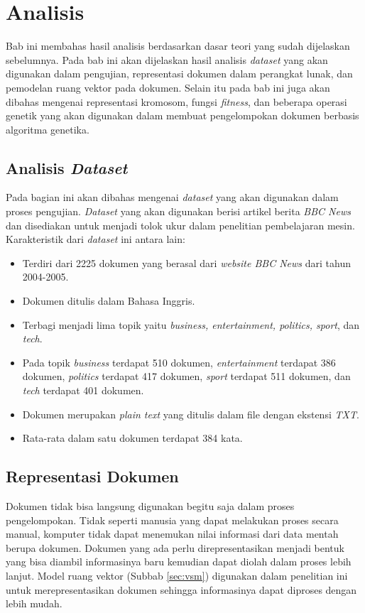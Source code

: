 \chapter{Analisis}
\label{chap:analisis}

Bab ini membahas hasil analisis berdasarkan dasar teori yang sudah dijelaskan sebelumnya. Pada bab ini akan dijelaskan hasil analisis \textit{dataset} yang akan digunakan dalam pengujian, representasi dokumen dalam perangkat lunak, dan pemodelan ruang vektor pada dokumen. Selain itu pada bab ini juga akan dibahas mengenai representasi kromosom, fungsi \textit{fitness}, dan beberapa operasi genetik yang akan digunakan dalam membuat pengelompokan dokumen berbasis algoritma genetika.

\section{Analisis \textit{Dataset}}
Pada bagian ini akan dibahas mengenai \textit{dataset} yang akan digunakan dalam proses pengujian. \textit{Dataset} yang akan digunakan berisi artikel berita \textit{BBC News} dan disediakan untuk menjadi tolok ukur dalam penelitian pembelajaran mesin. Karakteristik dari \textit{dataset} ini antara lain:

\begin{itemize}
	\item Terdiri dari 2225 dokumen yang berasal dari \textit{website BBC News} dari tahun 2004-2005.
	\item Dokumen ditulis dalam Bahasa Inggris.
	\item Terbagi menjadi lima topik yaitu \textit{business, entertainment, politics, sport}, dan \textit{tech}.
	\item Pada topik \textit{business} terdapat 510 dokumen, \textit{entertainment} terdapat 386 dokumen, \textit{politics} terdapat 417 dokumen, \textit{sport} terdapat 511 dokumen, dan \textit{tech} terdapat 401 dokumen.
	\item Dokumen merupakan \textit{plain text} yang ditulis dalam file dengan ekstensi \textit{TXT}.
	\item Rata-rata dalam satu dokumen terdapat 384 kata.
\end{itemize}

\section{Representasi Dokumen}
Dokumen tidak bisa langsung digunakan begitu saja dalam proses pengelompokan. Tidak seperti manusia yang dapat melakukan proses secara manual, komputer tidak dapat menemukan nilai informasi dari data mentah berupa dokumen. Dokumen yang ada perlu direpresentasikan menjadi bentuk yang bisa diambil informasinya baru kemudian dapat diolah dalam proses lebih lanjut. Model ruang vektor (Subbab \ref{sec:vsm}) digunakan dalam penelitian ini untuk merepresentasikan dokumen sehingga informasinya dapat diproses dengan lebih mudah.

